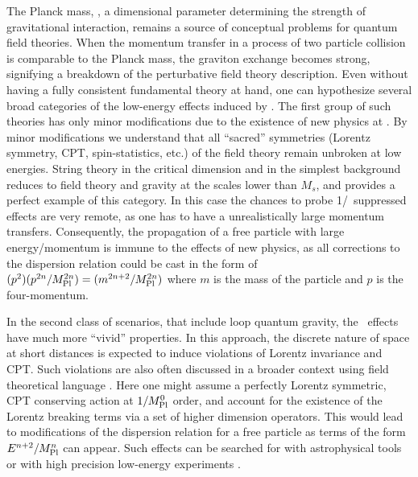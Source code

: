 The Planck mass, \Mpl, a dimensional parameter determining the
strength of gravitational interaction, remains a source of
conceptual problems for quantum field theories. When the momentum
transfer in a process of two particle collision is comparable to
the Planck mass, the graviton exchange becomes strong, signifying
a breakdown of the perturbative field theory description. Even
without having a fully consistent fundamental theory at hand, one
can hypothesize several broad categories of the low-energy effects
induced by \Mpl. The first group of such theories has only minor
modifications due to the existence of new physics at \Mpl. By
minor modifications we understand that all ``sacred'' symmetries
(Lorentz symmetry, CPT, spin-statistics, etc.) of the field theory
remain unbroken at low energies. String theory in the critical
dimension and in the simplest background reduces to field theory
and gravity at the scales lower than $M_{s}$, and provides a
perfect example of this category. In this case the chances to
probe 1/\Mpl\ suppressed effects are very remote, as one has to
have a unrealistically large momentum transfers. Consequently, the
propagation of a free particle with large energy/momentum is
immune to the effects of new physics, as all corrections to the
dispersion relation could be cast in the form of
$(p^2)(p^{2n}/M_{\rm Pl}^{2n})= (m^{2n+2}/M_{\rm Pl}^{2n})$ where
$m$ is the mass of the particle and $p$ is the four-momentum.

In the second class of scenarios, that include loop quantum gravity,
the \Mpl\ effects have much more ``vivid'' properties.
In this approach, the
discrete nature of space at short distances is expected to induce
violations of Lorentz invariance and CPT. Such violations are also
often discussed in a broader context using field theoretical
language \cite{Kost}. Here one might assume a perfectly Lorentz
symmetric, CPT conserving action at $1/M_{\rm Pl}^{0}$ order, and
account for the existence of the Lorentz breaking terms via a set
of higher dimension operators. This would lead to modifications of
the dispersion relation for a free particle as terms of the form
$E^{n+2}/M_{\rm {\small Pl}}^{n}$ can appear. Such effects can be searched for
with astrophysical tools \cite{mass,Jacob,wow,rot} or with high
precision low-energy experiments \cite{terra,Vuc}.

